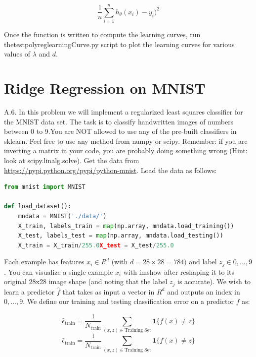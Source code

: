 \documentclass{article}
\newcommand{\1}{\mathbf{1}}
\begin{document}
$$\frac{1}{n}\sum_{i=1}^n h_\theta (x_i) - y_i)^2 $$

Once the function is written to compute the learning curves, run thetestpolyreglearningCurve.py script to plot the learning curves for various values of $\lambda$ and $d$.



\newpage
\section*{Ridge Regression on MNIST}
A.6. In this problem we will implement a regularized least squares classifier for the MNIST data set. The task is to classify handwritten images of numbers between 0 to 9.You are NOT allowed to use any of the pre-built classifiers in sklearn. Feel free to use any method from numpy or scipy. Remember: if you are inverting a matrix in your code, you are probably doing something wrong (Hint: look at scipy.linalg.solve). Get the data from \url{https://pypi.python.org/pypi/python-mnist}. Load the data as follows:
\begin{lstlisting}[language=Python]
from mnist import MNIST

def load_dataset():
    mndata = MNIST('./data/')
    X_train, labels_train = map(np.array, mndata.load_training())
    X_test, labels_test = map(np.array, mndata.load_testing())
    X_train = X_train/255.0X_test = X_test/255.0
\end{lstlisting}
Each example has features $x_i\in R^d$ (with $d=28\times28=784)$ and label $z_j\in{0,...,9}$. You can visualize a single example $x_i$ with imshow after reshaping it to its original 28x28 image shape (and noting that the label $z_j$ is accurate). We wish to learn a predictor $\hat f$ that takes as input a vector in $R^d$ and outputs an index in ${0,...,9}$. We define our training and testing classification error on a predictor $f$ as:

$$\widehat\epsilon_\text{train} = \frac{1}{N_\text{train}} \sum_{(x,z)\in\text{Training Set}} \1\{f(x)\ne z\}$$
$$\widehat\epsilon_\text{train} = \frac{1}{N_\text{train}} \sum_{(x,z)\in\text{Training Set}} \1\{f(x)\ne z\}$$
\end{document}
